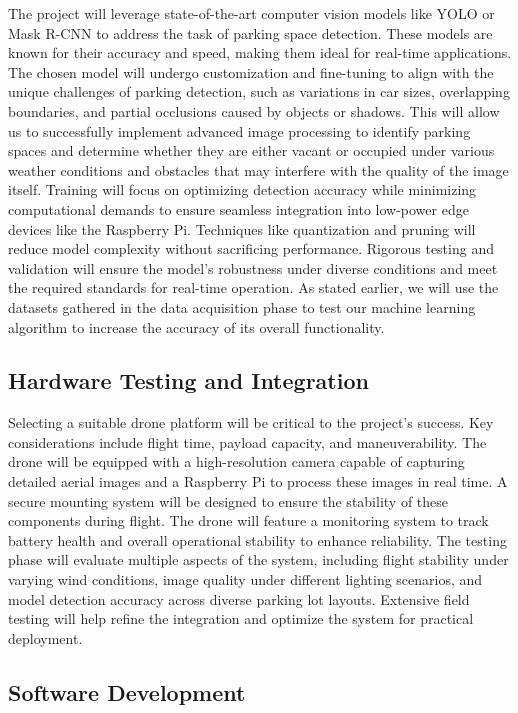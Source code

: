 \documentclass[conference]{IEEEtran}
\begin{document}
The project will leverage state-of-the-art computer vision models like YOLO or Mask R-CNN to address the task of parking space detection. 
These models are known for their accuracy and speed, 
making them ideal for real-time applications. 
The chosen model will undergo customization and fine-tuning to align with the unique challenges of parking detection, 
such as variations in car sizes, 
overlapping boundaries, 
and partial occlusions caused by objects or shadows. 
This will allow us to successfully implement advanced image processing to identify parking spaces and determine whether they are either vacant or occupied under various weather conditions and obstacles that may interfere with the quality of the image itself. 
Training will focus on optimizing detection accuracy while minimizing computational demands to ensure seamless integration into low-power edge devices like the Raspberry Pi. 
Techniques like quantization and pruning will reduce model complexity without sacrificing performance. 
Rigorous testing and validation will ensure the model’s robustness under diverse conditions and meet the required standards for real-time operation. 
As stated earlier,
we will use the datasets gathered in the data acquisition phase to test our machine learning algorithm to increase the accuracy of its overall functionality.

\subsection{Hardware Testing and Integration}

Selecting a suitable drone platform will be critical to the project’s success. 
Key considerations include flight time, 
payload capacity, 
and maneuverability. 
The drone will be equipped with a high-resolution camera capable of capturing detailed aerial images and a Raspberry Pi to process these images in real time. 
A secure mounting system will be designed to ensure the stability of these components during flight. 
The drone will feature a monitoring system to track battery health and overall operational stability to enhance reliability. 
The testing phase will evaluate multiple aspects of the system, 
including flight stability under varying wind conditions, 
image quality under different lighting scenarios, 
and model detection accuracy across diverse parking lot layouts. 
Extensive field testing will help refine the integration and optimize the system for practical deployment.

\subsection{Software Development}
\end{document}
